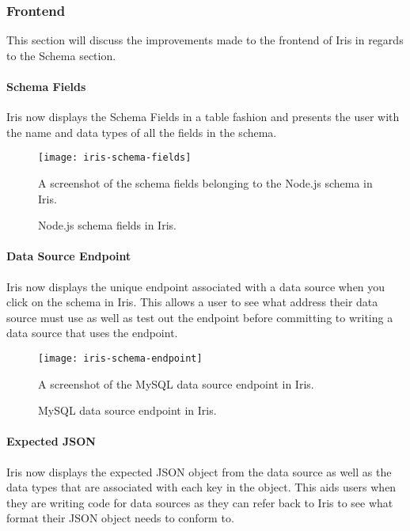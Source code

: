 \documentclass[12pt,a4paper,titlepage]{report}
\begin{document}
\subsubsection{Frontend}
This section will discuss the improvements made to the frontend of Iris in regards to the Schema section.

\paragraph{Schema Fields}
Iris now displays the Schema Fields in a table fashion and presents the user with the name and data types of all the fields in the schema.
\begin{figure}[H]
\begin{tcolorbox}
\begin{center}
\texttt{[image: iris-schema-fields]}
\end{center}
A screenshot of the schema fields belonging to the Node.js schema in Iris.
\end{tcolorbox}
\caption{Node.js schema fields in Iris.}
\end{figure}

\paragraph{Data Source Endpoint}
Iris now displays the unique endpoint associated with a data source when you click on the schema in Iris. This allows a user to see what address their data source must use as well as test out the endpoint before committing to writing a data source that uses the endpoint.

\begin{figure}[H]
\begin{tcolorbox}
\begin{center}
\texttt{[image: iris-schema-endpoint]}
\end{center}
A screenshot of the MySQL data source endpoint in Iris.
\end{tcolorbox}
\caption{MySQL data source endpoint in Iris.}
\end{figure}

\paragraph{Expected JSON}
Iris now displays the expected JSON object from the data source as well as the data types that are associated with each key in the object. This aids users when they are writing code for data sources as they can refer back to Iris to see what format their JSON object needs to conform to.
\end{document}
